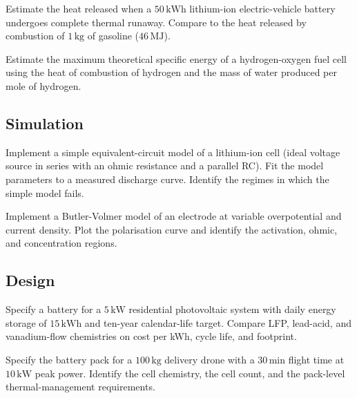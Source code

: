 \begin{exercise}
Estimate the heat released when a $50\,\text{kWh}$ lithium-ion
electric-vehicle battery undergoes complete thermal runaway. Compare
to the heat released by combustion of $1\,\text{kg}$ of gasoline
($46\,\text{MJ}$).
\end{exercise}

\begin{exercise}
Estimate the maximum theoretical specific energy of a
hydrogen-oxygen fuel cell using the heat of combustion of hydrogen
and the mass of water produced per mole of hydrogen.
\end{exercise}

\subsection*{Simulation}

\begin{exercise}
Implement a simple equivalent-circuit model of a lithium-ion cell
(ideal voltage source in series with an ohmic resistance and a
parallel RC). Fit the model parameters to a measured discharge curve.
Identify the regimes in which the simple model fails.
\end{exercise}

\begin{exercise}
Implement a Butler-Volmer model of an electrode at variable
overpotential and current density. Plot the polarisation curve and
identify the activation, ohmic, and concentration regions.
\end{exercise}

\subsection*{Design}

\begin{exercise}
Specify a battery for a $5\,\text{kW}$ residential photovoltaic
system with daily energy storage of $15\,\text{kWh}$ and ten-year
calendar-life target. Compare LFP, lead-acid, and vanadium-flow
chemistries on cost per kWh, cycle life, and footprint.
\end{exercise}

\begin{exercise}
Specify the battery pack for a $100\,\text{kg}$ delivery drone with
a $30\,\text{min}$ flight time at $10\,\text{kW}$ peak power.
Identify the cell chemistry, the cell count, and the pack-level
thermal-management requirements.
\end{exercise}


